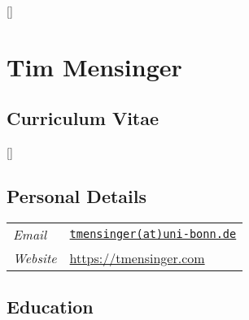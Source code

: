 \documentclass{article}
\begin{document}
\thispagestyle{empty}
\renewcommand\labelitemi{\tiny$\bullet$}

\titlespacing*{\section}{0pt}{0pt}{0pt}
\titlespacing*{\subsection}{0pt}{0pt}{0pt}

\titleformat{\section}{\normalfont\Large\bfseries}{\thesection}{1em}{}[{\titlerule[0.8pt]}]


\section*{\hfill \LARGE Tim Mensinger}\vspace*{3pt}
\subsection*{\hfill Curriculum Vitae}

\titleformat{\subsection}{\normalfont\bfseries}{\thesection}{1em}{}[{\titlerule[0.4pt]}]

\vspace{15pt}
\subsection*{Personal Details}

\begin{table}[h!]
    \renewcommand{\arraystretch}{1.4}
    \begin{tabular}{p{110pt} p{350pt}}
         \textit{Email} & \href{mailto:tmensinger@uni-bonn.de}{\texttt{tmensinger(at)uni-bonn.de}}\\
         \textit{Website} & \url{https://tmensinger.com}
    \end{tabular}
\end{table}


\subsection*{Education}
\end{document}
